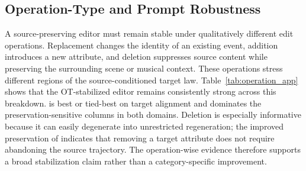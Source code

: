 \subsection{Operation-Type and Prompt Robustness}
\label{app:operation_robustness}

A source-preserving editor must remain stable under qualitatively different edit operations.
Replacement changes the identity of an existing event, addition introduces a new attribute, and deletion suppresses source content while preserving the surrounding scene or musical context.
These operations stress different regions of the source-conditioned target law.
Table~\ref{tab:operation_app} shows that the OT-stabilized editor remains consistently strong across this breakdown.
\methodplus is best or tied-best on target alignment and dominates the preservation-sensitive columns in both domains.
Deletion is especially informative because it can easily degenerate into unrestricted regeneration; the improved preservation of \methodplus indicates that removing a target attribute does not require abandoning the source trajectory.
The operation-wise evidence therefore supports a broad stabilization claim rather than a category-specific improvement.

